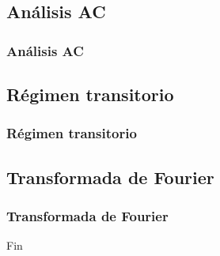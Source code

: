 \documentclass{beamer}
\begin{document}
\subsection{Análisis AC}
\begin{frame}
\frametitle{Análisis AC}
\end{frame}
\subsection{Régimen transitorio}
\begin{frame}
\frametitle{Régimen transitorio}
\end{frame}
\subsection{Transformada de Fourier}
\begin{frame}
\frametitle{Transformada de Fourier}
\end{frame}

\begin{frame}
\Huge{\centerline{Fin}}
\end{frame}

\end{document}

